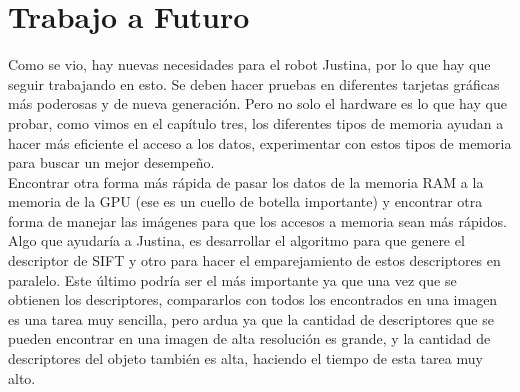 \section{Trabajo a Futuro}
Como se vio, hay nuevas necesidades para el robot Justina, por lo que hay que seguir trabajando en esto. Se deben hacer pruebas en diferentes tarjetas gráficas más poderosas y de nueva generación. Pero no solo el hardware es lo que hay que probar, como vimos en el capítulo tres, los diferentes tipos de memoria ayudan a hacer más eficiente el acceso a los datos, experimentar con estos tipos de memoria para buscar un mejor desempeño.\\
Encontrar otra forma más rápida de pasar los datos de la memoria RAM a la memoria de la GPU (ese es un cuello de botella importante) y encontrar otra forma de manejar las imágenes para que los accesos a memoria sean más rápidos.\\
Algo que ayudaría a Justina, es desarrollar el algoritmo para que genere el descriptor de SIFT y otro para hacer el emparejamiento de estos descriptores en paralelo. Este último podría ser el más importante ya que una vez que se obtienen los descriptores, compararlos con todos los encontrados en una imagen es una tarea muy sencilla, pero ardua ya que la cantidad de descriptores que se pueden encontrar en una imagen de alta resolución es grande, y la cantidad de descriptores del objeto también es alta, haciendo el tiempo de esta tarea muy alto. \nocite{AIShack} \nocite{dicc}

 
 
